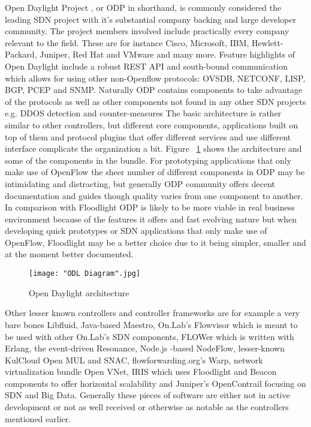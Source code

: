 \documentclass[english]{tktltiki2}
\theoremstyle{definition}
\theoremstyle{remark}
\begin{document}
Open Daylight Project \cite{ODL}, or ODP in shorthand, is commonly considered the leading SDN project with it’s substantial company backing and large developer community. The project members involved include practically every company relevant to the field. These are for instance Cisco, Microsoft, IBM, Hewlett-Packard, Juniper, Red Hat and VMware and many more. Feature highlights of Open Daylight include  a robust REST API and south-bound communication which allows for using other non-Openflow protocols: OVSDB, NETCONF, LISP, BGP, PCEP and SNMP. Naturally ODP contains components to take advantage of the protocols as well as other components not found in any other SDN projects e.g. DDOS detection and counter-measures The basic architecture is rather similar to other controllers, but different core components, applications built on top of them and protocol plugins that offer different services and use different interface complicate the organization a bit. Figure ~\ref{fig:ODL} shows the architecture and some of the components in the bundle. For prototyping applications that only make use of OpenFlow the sheer number of different components in ODP may be intimidating and distracting, but generally ODP community offers decent documentation and guides though quality varies from one component to another. In comparison with Floodlight ODP is likely to be more viable in real business environment because of the features it offers and fast evolving nature but when developing quick prototypes or SDN applications that only make use of OpenFlow, Floodlight may be a better choice due to it being simpler, smaller and at the moment better documented.

\begin{figure}[h!t]
\centering
{}
\texttt{[image: "ODL Diagram".jpg]}
\caption{Open Daylight architecture}
\label{fig:ODL}
\end{figure}

Other lesser known controllers and controller frameworks are for example a very bare bones Libfluid, Java-based Maestro, On.Lab’s Flowvisor which is meant to be used with other On.Lab’s SDN components, FLOWer which is written with Erlang, the event-driven Resonance, Node.js -based NodeFlow, lesser-known KulCloud Open MUL and SNAC, flowforwarding.org’s Warp, network virtualization bundle Open VNet, IRIS which uses Floodlight and Beacon components to offer horizontal scalability and Juniper’s OpenContrail focusing on SDN and Big Data. Generally these pieces of software are either not in active development or not as well received or otherwise as notable as the controllers mentioned earlier.
\end{document}
